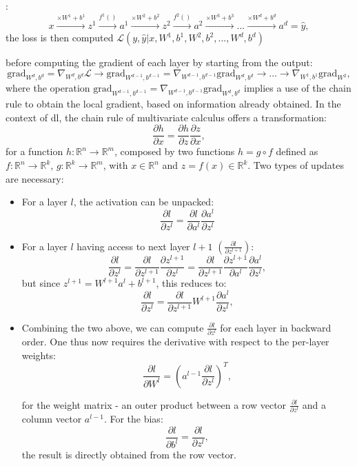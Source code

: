 
: \[ x \xrightarrow{\times W^1 + b^1} z^1 \xrightarrow{f^1()} a^1 \xrightarrow{\times W^2 + b^2} z^2 \xrightarrow{f^2()} a^2 \xrightarrow{\times W^3 + b^3} ... \xrightarrow{\times W^d + b^d} a^d = \hat{y},\] the loss is then computed $\mathcal{L}(y, \hat{y} | x, W^1, b^1, W^2, b^2, ..., W^d, b^d)$ 

before computing the gradient of each layer by starting from the output:\[\text{grad}_{W^d, b^d} = \nabla_{W^d, b^d} \mathcal{L} \rightarrow \text{grad}_{W^{d-1}, b^{d-1}} = \nabla_{W^{d-1}, b^{d-1}} \text{grad}_{W^d, b^d} \rightarrow ... \rightarrow \nabla_{W^{1}, b^1} \text{grad}_{W^2}, \]
where the operation $\text{grad}_{W^{d-1}, b^{d-1}} = \nabla_{W^{d-1}, b^{d-1}} \text{grad}_{W^d, b^{d}}$ implies a use of the chain rule to obtain the local gradient, based on information already obtained. In the context of \gls{dl}, the chain rule of multivariate calculus offers a transformation:
\begin{equation}
    \frac{\partial h}{\partial x} = \frac{\partial h}{\partial z}\frac{\partial z}{\partial x},
\end{equation}
for a function $h: \mathbb{R}^n \rightarrow \mathbb{R}^m$, composed by two functions $h = g \circ f$ defined as $f: \mathbb{R}^n \rightarrow \mathbb{R}^k$, $g: \mathbb{R}^k \rightarrow \mathbb{R}^m$, with $x \in \mathbb{R}^n$ and $z = f(x) \in \mathbb{R}^k$. Two types of updates are necessary: 
\begin{itemize}
    \item For a layer $l$, the activation can be unpacked: \[\frac{\partial l}{\partial z^l} = \frac{\partial l}{\partial a^l} \frac{\partial a^l}{\partial z^l}\]
    \item For a layer $l$ having access to next layer $l+1$ $(\frac{\partial l}{\partial z^{l+1}})$: \[\frac{\partial l}{\partial z^l} = \frac{\partial l}{\partial z^{l+1}} \frac{\partial z^{l+1}}{\partial z^l} = \frac{\partial l}{\partial z^{l+1}} \frac{\partial z^{l+1}}{\partial a^l} \frac{\partial a^l}{\partial z^l}, \] but since $z^{l+1} = W^{l+1}a^l + b^{l+1}$, this reduces to:\[\frac{\partial l}{\partial z^l} = \frac{\partial l}{\partial z^{l+1}} W^{l+1} \frac{\partial a^l}{\partial z^l}, \]

    \item Combining the two above, we can compute $\frac{\partial l}{\partial z^l}$ for each layer in backward order. One thus now requires the derivative with respect to the per-layer weights: \[\frac{\partial l}{\partial W^l} = (a^{l-1} \frac{\partial l}{\partial z^l})^T,\] 
    
    for the weight matrix - an outer product between a row vector $\frac{\partial l}{\partial z^l}$ and a column vector $a^{l-1}$. For the bias: \[\frac{\partial l}{\partial b^l} = \frac{\partial l}{\partial z^l},\] the result is directly obtained from the row vector. 
\end{itemize}